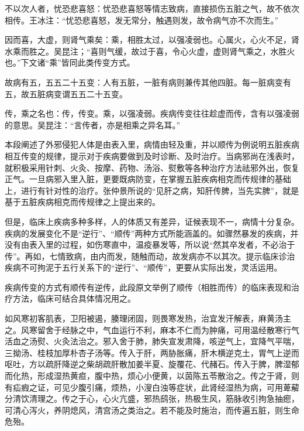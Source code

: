 \documentclass[draft,12pt]{ctexbook}
\begin{document}
\begin{jiaozhu}
	\item 不以次人者，忧恐悲喜怒：忧恐悲喜怒等情志致病，直接损伤五脏之气，故不依次相传。王冰注：“忧恐悲喜怒，发无常分，触遇则发，故令病气亦不次而生。”
	\item 因而喜，大虚，则肾气乘矣：乘，相胜太过，以强凌弱也。心属火，心火不足，肾水乘而胜之。吴昆注；“喜则气缓，故过于喜，令心火虚，虚则肾气乘之，水胜火也。”下文诸“乘”皆同此类传变方式。
	\item 故病有五，五五二十五变：人有五脏，一脏有病则兼传其他四脏。每一脏病变有五，故五脏病变谓五五二十五变。
	\item 传，乘之名也：传，传变。乘，以强凌弱。疾病传变往往趁虚而传，含有以强凌弱的意思。吴昆注：“言传者，亦是相乘之异名耳。”
\end{jiaozhu}



本段阐述了外邪侵犯人体是由表入里，病情由轻及重，并以顺传为例说明五脏疾病相互传变的规律，提示对于疾病要做到及时诊断、及时治疗。当病邪尚在浅表时，就积极采用针刺、火灸、按摩、药物、汤浴、熨敷等各种治疗方法祛邪外出，恢复正气。一旦病邪入里入脏，更要既病防变，在掌握五脏疾病相克而传规律的基础上，进行有针对性的治疗。张仲景所说的“见肝之病，知肝传脾，当先实脾”，就是基于五脏疾病相克而传规律之上提出来的。

但是，临床上疾病多种多样，人的体质又有差异，证候表现不一，病情十分复杂。疾病的发展变化不是“逆行”、“顺传”两种方式所能涵盖的。如骤然暴发的疾病，并没有由表入里的过程，如伤寒直中，温疫暴发等，所以说“然其卒发者，不必治于传”。再如，七情致病，由内而发，随触而动，故发病亦不以其次。提示临床诊治疾病不可拘泥于五行关系下的“逆行”、“顺传”，更要从实际出发，灵活运用。


疾病传变的方式有顺传有逆传，此段原文举例了顺传（相胜而传）的临床表现和治疗方法，临床可结合具体情况用之。

如风寒初客肌表，卫阳被遏，腠理闭固，则畏寒发热，治宜发汗解表，麻黄汤主之。风寒留舍于经脉之中，气血运行不利，麻本不仁而为肿痛，可用温经散寒行气活血之汤熨、火灸法治之。邪入舍于肺，肺失宣发肃降，咳逆气上，宜降气平喘，三拗汤、桂枝加厚朴杏子汤等。传入于肝，两胁胀痛，肝木横逆克土，胃气上逆而呕吐，方以疏肝降逆之柴胡疏肝散加姜半夏、旋覆花、代赭石。传入于脾，脾湿郁而化热，形成湿热黄疸，腹中热，烦心小便黄，以茵陈五苓散治之。传之于肾，则有疝瘕之证，可见少腹引痛，烦热，小溲白浊等症状，此肾经湿热为病，可用萆薢分清饮清理之。传之于心，心火亢盛，邪热鸱张，热极生风，筋脉收引拘急抽瘛，可清心泻火，养阴熄风，清宫汤之类治之。若不能及时施治，而传遍五脏，则生命危殆。
\end{document}
